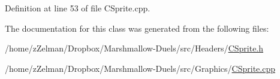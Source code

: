 Definition at line 53 of file C\-Sprite.\-cpp.



The documentation for this class was generated from the following files\-:\begin{DoxyCompactItemize}
\item 
/home/z\-Zelman/\-Dropbox/\-Marshmallow-\/\-Duels/src/\-Headers/\hyperlink{CSprite_8h}{C\-Sprite.\-h}\item 
/home/z\-Zelman/\-Dropbox/\-Marshmallow-\/\-Duels/src/\-Graphics/\hyperlink{CSprite_8cpp}{C\-Sprite.\-cpp}\end{DoxyCompactItemize}
